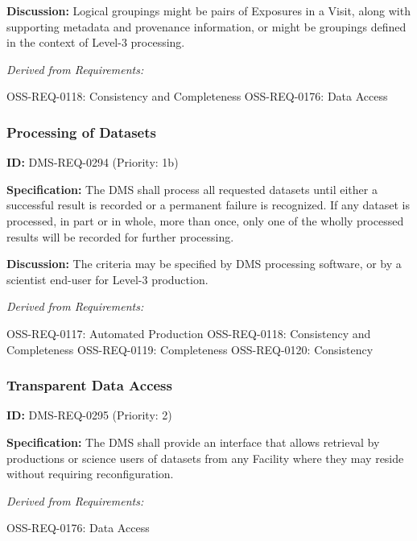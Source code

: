 \documentclass[SE,toc,lsstdraft]{lsstdoc}
\begin{document}
\textbf{Discussion: }Logical groupings might be pairs of Exposures in a Visit, along with supporting metadata and provenance information, or might be groupings defined in the context of Level-3 processing.

\emph{Derived from Requirements:}

OSS-REQ-0118:
Consistency and Completeness \newline
OSS-REQ-0176:
Data Access \newline

\subsubsection{Processing of Datasets}

\label{DMS-REQ-0294}
\textbf{ID:} DMS-REQ-0294 (Priority: 1b)

\textbf{Specification:} The DMS shall process all requested datasets until either a successful result is recorded or a permanent failure is recognized. If any dataset is processed, in part or in whole, more than once, only one of the wholly processed results will be recorded for further processing.

\textbf{Discussion: }The criteria may be specified by DMS processing software, or by a scientist end-user for Level-3 production.

\emph{Derived from Requirements:}

OSS-REQ-0117:
Automated Production \newline
OSS-REQ-0118:
Consistency and Completeness \newline
OSS-REQ-0119:
Completeness \newline
OSS-REQ-0120:
Consistency \newline

\subsubsection{Transparent Data Access}

\label{DMS-REQ-0295}
\textbf{ID:} DMS-REQ-0295 (Priority: 2)

\textbf{Specification:} The DMS shall provide an interface that allows retrieval by productions or science users of datasets from any Facility where they may reside without requiring reconfiguration.

\emph{Derived from Requirements:}

OSS-REQ-0176:
Data Access \newline
\end{document}

